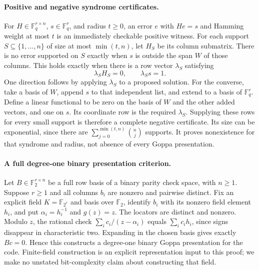 \documentclass[11pt]{article}
\begin{document}
\paragraph{Positive and negative syndrome certificates.}
For $H\in\mathbb F_q^{r\times n}$, $s\in\mathbb F_q^r$, and radius
$t\ge0$, an error $e$ with $He=s$ and Hamming weight at most $t$ is an
immediately checkable positive witness.
For each support $S\subseteq\{1,\ldots,n\}$ of size at most
$\min(t,n)$, let $H_S$ be its column submatrix. There is no error supported
on $S$ exactly when $s$ is outside the span $W$ of those columns.
This holds exactly when there is a row vector $\lambda_S$ satisfying
\[
\lambda_SH_S=0,\qquad\lambda_S s=1.
\]
One direction follows by applying $\lambda_S$ to a proposed solution.
For the converse, take a basis of $W$, append $s$ to that independent list,
and extend to a basis of $\mathbb F_q^r$. Define a linear functional to be
zero on the basis of $W$ and the other added vectors, and one on $s$.
Its coordinate row is the required $\lambda_S$.
Supplying these rows for every small support is therefore a complete negative
certificate. Its size can be exponential, since there are
$\sum_{j=0}^{\min(t,n)}\binom nj$ supports. It proves nonexistence for that
syndrome and radius, not absence of every Goppa presentation.

\paragraph{A full degree-one binary presentation criterion.}
Let $B\in\mathbb F_2^{r\times n}$ be a full row basis of a binary parity
check space, with $n\ge1$. Suppose $r\ge1$ and all columns $b_i$ are nonzero
and pairwise distinct. Fix an explicit field $K=\mathbb F_{2^r}$ and basis
over $\mathbb F_2$, identify $b_i$ with its nonzero field element $h_i$, and
put $\alpha_i=h_i^{-1}$ and $g(z)=z$.
The locators are distinct and nonzero. Modulo $z$, the rational check
$\sum_i c_i/(z-\alpha_i)$ equals $\sum_i c_i h_i$, since signs disappear
in characteristic two. Expanding in the chosen basis gives exactly $Bc=0$.
Hence this constructs a degree-one binary Goppa presentation for the code.
Finite-field construction is an explicit representation input to this proof;
we make no unstated bit-complexity claim about constructing that field.
\end{document}
